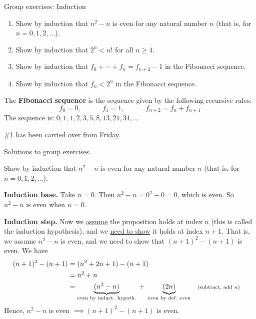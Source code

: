 \documentclass[10pt]{beamer}
\begin{document}
\begin{frame}{Group exercises: Induction}
\footnotesize 

\begin{enumerate}
\item Show by induction that $n^2-n$ is even for any natural number $n$ (that is, for $n=0,1,2,\hdots$).
\item  Show by induction that $2^n < n!$ for all $n \geq 4$.	
\item Show by induction that $f_0 + \cdots + f_n = f_{n+2} -1$ in the Fibonacci sequence.
\item Show by induction that $f_n < 2^n$ in the Fibonacci sequence. 
\end{enumerate}
\vfill 
\begin{mygreenbox}[title=Definition]
The \textbf{Fibonacci sequence} is the sequence given by the following recursive rules:
\[f_0 =0, \qquad \quad f_1 =1, \qquad \quad f_{n+2} = f_n + f_{n+1} \]
The sequence is: $0,1,1,2,3,5,8,13,21,34, \hdots$
\end{mygreenbox}
\vfill 
\begin{myyellowbox}[title=Logistics Alert]
 \#1 has been carried over from Friday.	
\end{myyellowbox}

\end{frame}

\begin{frame}[standout]
Solutions to group exercises.	
\end{frame}


\begin{frame}

\begin{mygreenbox}[title=Exercise 1]
Show by induction that $n^2-n$ is even for any natural number $n$ (that is, for $n=0,1,2,\hdots$).
\end{mygreenbox}

\vfill \vfill 
\begin{myyellowbox}[title=Solution]
\textbf{Induction base.} Take $n=0$.  Then $n^2-n = 0^2-0 = 0$, which is even. So $n^2-n$ is even when $n=0$.

\vspace{0.5cm}

\textbf{Induction step.} Now we \underline{assume} the proposition holds at index $n$ (this is called the \alert{induction hypothesis}), and we \underline{need to show} it holds at index $n+1$.  That is, we assume $n^2-n$ is even, and we need to show that $(n+1)^2-(n+1)$ is even.  We have
%
\begin{align*}
(n+1)^2-(n+1) &= (n^2+2n+1) - (n+1) \\
&= n^2+n  \\
&= \explaintermbrace{even by induct. hypoth.}{(n^2 -n)} \; + \; \explaintermbrace{even by def. even}{(2n)}  && \scripttext{(subtract, add $n$)}	
\end{align*}
Hence, $n^2-n$ is even $\implies (n+1)^2-(n+1)$ is even.
\end{myyellowbox}

\end{frame}
\end{document}
